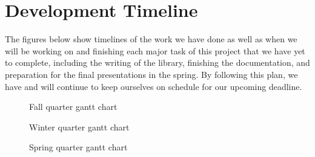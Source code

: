 \chapter{Development Timeline}

The figures below show timelines of the work we have done as well as when we will be working on and finishing each major task of this project that we have yet to complete, including the writing of the library, finishing the documentation, and preparation for the final presentations in the spring. By following this plan, we have and will continue to keep ourselves on schedule for our upcoming deadline.
\newline

\begin{figure}[!h]
\noindent\resizebox{\textwidth}{!}{
  
}
\caption{Fall quarter gantt chart}
\label{fig:gantt-fall}
\end{figure}


\begin{figure}[!h]
\noindent\resizebox{\textwidth}{!}{
  
}
\caption{Winter quarter gantt chart}
\label{fig:gantt-winter}
\end{figure}


\begin{figure}[!h]
\noindent\resizebox{\textwidth}{!}{
  
}
\caption{Spring quarter gantt chart}
\label{fig:gantt-spring}
\end{figure}
